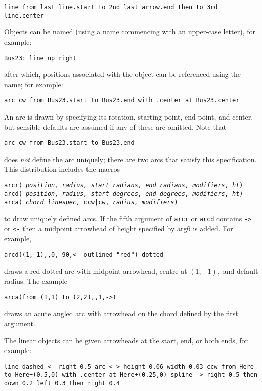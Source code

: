 {\tt line from last line.start to 2nd last arrow.end then to 3rd line.center}

Objects can be named (using a name commencing with an upper-case letter),
for example:

{\tt Bus23: line up right}

\noindent
after which, positions associated with the object can be referenced using the
name; for example:

{\tt arc cw from Bus23.start to Bus23.end with .center at Bus23.center}

An arc is drawn by specifying its rotation, starting point, end point, and
center, but sensible defaults are assumed if any of these are omitted.
Note that

{\tt arc cw from Bus23.start to Bus23.end}

\noindent
does {\em not} define the arc uniquely; there are two arcs that satisfy this
specification.
This distribution includes the \Mfour macros

{\tt arcr( {\sl position, radius, start radians, end radians, modifiers, ht})
\hfill\break\indent
     arcd( {\sl position, radius, start degrees, end degrees, modifiers, ht})
\hfill\break\indent
     arca( {\sl chord linespec,} ccw|cw, {\sl radius, modifiers})
}

\noindent to draw uniquely defined arcs.
If the fifth argument of {\tt arcr} or {\tt arcd} contains {\tt ->} or {\tt <-}
then a midpoint arrowhead of height specified by arg6 is added.
For example,

{\tt arcd((1,-1),{},0,-90,<- outlined "red") dotted}

\noindent draws a red dotted arc with midpoint arrowhead,
 centre at $(1,-1),$ and default radius.
 The example

{\tt arca(from (1,1) to (2,2),{,}1,->)}

\noindent draws an acute angled arc with arrowhead on the chord defined by the
first argument.

The linear objects can be given arrowheads at the start, end, or both ends,
for example:

{\tt line dashed <- right 0.5\hfill\break
\hspace*{\parindent}%
arc <-> height 0.06 width 0.03 ccw from Here to Here+(0.5,0)
 \hfill\break
\hspace*{2\parindent}%
   with .center at Here+(0.25,0)\hfill\break
\hspace*{\parindent}%
spline -> right 0.5 then down 0.2 left 0.3 then right 0.4}

